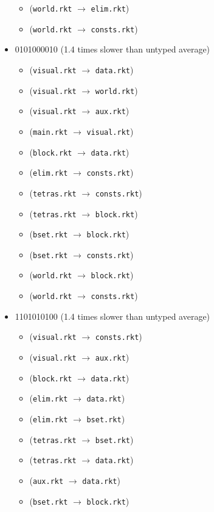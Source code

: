 \documentclass{article}
\newcommand{\mono}[1]{\texttt{#1}}
\begin{document}
\begin{itemize}
\begin{itemize}
  \item (\mono{world.rkt} $\rightarrow$ \mono{elim.rkt})
  \item (\mono{world.rkt} $\rightarrow$ \mono{consts.rkt})
  \end{itemize}
\item 0101000010 (1.4 times slower than untyped average)
  \begin{itemize}
  \item (\mono{visual.rkt} $\rightarrow$ \mono{data.rkt})
  \item (\mono{visual.rkt} $\rightarrow$ \mono{world.rkt})
  \item (\mono{visual.rkt} $\rightarrow$ \mono{aux.rkt})
  \item (\mono{main.rkt} $\rightarrow$ \mono{visual.rkt})
  \item (\mono{block.rkt} $\rightarrow$ \mono{data.rkt})
  \item (\mono{elim.rkt} $\rightarrow$ \mono{consts.rkt})
  \item (\mono{tetras.rkt} $\rightarrow$ \mono{consts.rkt})
  \item (\mono{tetras.rkt} $\rightarrow$ \mono{block.rkt})
  \item (\mono{bset.rkt} $\rightarrow$ \mono{block.rkt})
  \item (\mono{bset.rkt} $\rightarrow$ \mono{consts.rkt})
  \item (\mono{world.rkt} $\rightarrow$ \mono{block.rkt})
  \item (\mono{world.rkt} $\rightarrow$ \mono{consts.rkt})
  \end{itemize}
\item 1101010100 (1.4 times slower than untyped average)
  \begin{itemize}
  \item (\mono{visual.rkt} $\rightarrow$ \mono{consts.rkt})
  \item (\mono{visual.rkt} $\rightarrow$ \mono{aux.rkt})
  \item (\mono{block.rkt} $\rightarrow$ \mono{data.rkt})
  \item (\mono{elim.rkt} $\rightarrow$ \mono{data.rkt})
  \item (\mono{elim.rkt} $\rightarrow$ \mono{bset.rkt})
  \item (\mono{tetras.rkt} $\rightarrow$ \mono{bset.rkt})
  \item (\mono{tetras.rkt} $\rightarrow$ \mono{data.rkt})
  \item (\mono{aux.rkt} $\rightarrow$ \mono{data.rkt})
  \item (\mono{bset.rkt} $\rightarrow$ \mono{block.rkt})

\end{itemize}
\end{itemize}
\end{document}
